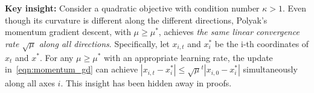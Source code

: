 \documentclass{article}
\newcommand{\yell}[1]{#1}
\begin{document}
{\bf Key insight:}
%
Consider a quadratic objective with condition number $\kappa > 1$.
Even though its curvature is different along the different directions,
Polyak's momentum gradient descent, with $\mu \geq \mu^*$, achieves \emph{the same linear convergence rate $\sqrt{\mu}$ along all directions}. Specifically, let $x_{i, t}$ and $x_i^*$ be the i-th coordinates of $x_t$ and $x^*\!$.
For any $\mu \geq \mu^*$ with an appropriate learning rate, the update in~\eqref{eqn:momentum_gd} can achieve $| x_{i, t} - x_i^* | \leq \sqrt{\mu}^t | x_{i,0} - x_i^* |$ simultaneously along all axes $i$.
This insight has been hidden away in proofs.
\end{document}
